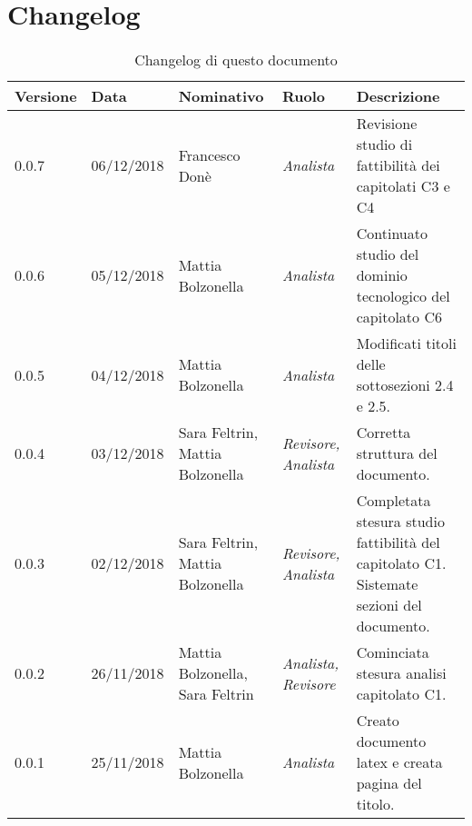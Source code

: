 \section{Changelog}
\begin{table}[tbph]
        \centering
        \begin{tabularx}{\textwidth}{|l|l|l|l|X|}
                \hline
                \textbf{Versione} & \textbf{Data} & \textbf{Nominativo}  & \textbf{Ruolo} & 
                \textbf{Descrizione}\\
                \hline \hline
              	0.0.7 & 06/12/2018 & Francesco Donè & \textit{Analista} & 
              	Revisione studio di fattibilità dei capitolati C3 e C4\\
              	0.0.6 & 05/12/2018 & Mattia Bolzonella & \textit{Analista} & 
              	Continuato studio del dominio tecnologico del capitolato C6\\
              	\hline
              	0.0.5 & 04/12/2018 & Mattia Bolzonella & \textit{Analista} & 
              	Modificati titoli delle sottosezioni 2.4 e 2.5. \\
              	\hline
              	0.0.4 & 03/12/2018 & Sara Feltrin, Mattia Bolzonella 
              	& \textit{Revisore, Analista} & Corretta struttura del documento. \\
              	\hline
              	0.0.3 & 02/12/2018 & Sara Feltrin, Mattia Bolzonella & \textit{Revisore, Analista}
              	& Completata stesura studio fattibilità del capitolato C1.
              	Sistemate sezioni del documento. \\
              	\hline
              	0.0.2 & 26/11/2018 & Mattia Bolzonella, Sara Feltrin & \textit{Analista, Revisore}
              	& Cominciata stesura analisi capitolato C1.\\
                \hline
                0.0.1 & 25/11/2018 & Mattia Bolzonella & \textit{Analista}
                & Creato documento latex e creata pagina del titolo.\\
                \hline
              	
        \end{tabularx}
        \caption{Changelog di questo documento}
\end{table}